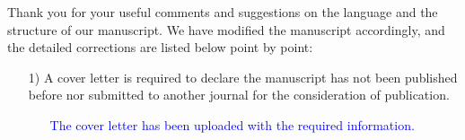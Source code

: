 \documentclass[10pt,stdletter,dateno,sigleft]{newlfm} %
\begin{document}
\begin{newlfm}

Thank you for your useful comments and suggestions on the language and the structure
of our manuscript. We have modified the manuscript accordingly, and the detailed
corrections are listed below point by point: 

\begin{enumerate}
\item[1)] A cover letter is required to declare the manuscript has not been published before nor submitted to another journal for the consideration of publication. 
\begin{adjustwidth}{1cm}{0cm}
\qquad 
\begin{itemize}
\item[\checkmark]
\textcolor{blue}{ The cover letter has been uploaded with the required information.}
\end{itemize}

\end{adjustwidth} 
\end{enumerate}









\end{newlfm}
\end{document}
